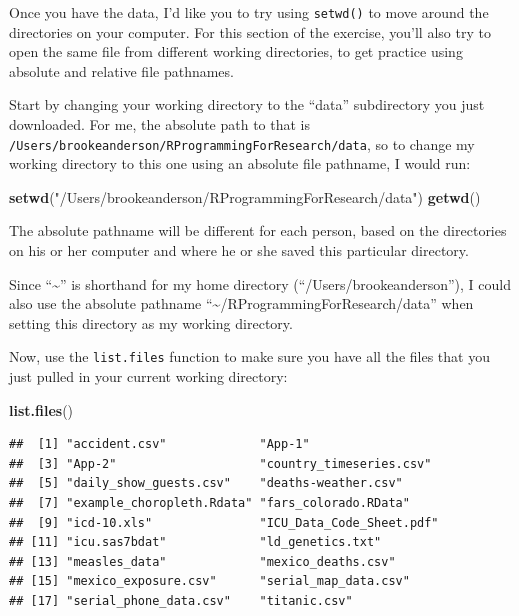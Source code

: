 \documentclass[]{book}
\makeatletter
\newenvironment{Shaded}{\begin{snugshade}}{\end{snugshade}}
\newcommand{\KeywordTok}[1]{\textcolor[rgb]{0.13,0.29,0.53}{\textbf{#1}}}
\newcommand{\StringTok}[1]{\textcolor[rgb]{0.31,0.60,0.02}{#1}}
\newcommand{\NormalTok}[1]{#1}
\newenvironment{kframe}{%
\medskip{}
\setlength{\fboxsep}{.8em}
 \def\at@end@of@kframe{}%
 \ifinner\ifhmode%
  \def\at@end@of@kframe{\end{minipage}}%
  \begin{minipage}{\columnwidth}%
 \fi\fi%
 \def\FrameCommand##1{\hskip\@totalleftmargin \hskip-\fboxsep
 \colorbox{shadecolor}{##1}\hskip-\fboxsep
     \hskip-\linewidth \hskip-\@totalleftmargin \hskip\columnwidth}%
 \MakeFramed {\advance\hsize-\width
   \@totalleftmargin\z@ \linewidth\hsize
   \@setminipage}}%
 {\par\unskip\endMakeFramed%
 \at@end@of@kframe}
\renewenvironment{Shaded}{\begin{kframe}}{\end{kframe}}
\newenvironment{rmdblock}[1]
  {
  \begin{itemize}
  \renewcommand{\labelitemi}{
    \raisebox{-.7\height}[0pt][0pt]{
      {\setkeys{Gin}{width=3em,keepaspectratio}\texttt{[image: images/\#1]}}
    }
  }
  \setlength{\fboxsep}{1em}
  \begin{kframe}
  \item
  }
  {
  \end{kframe}
  \end{itemize}
  }
\newenvironment{rmdnote}
  {\begin{rmdblock}{note}}
  {\end{rmdblock}}
\theoremstyle{definition}
\theoremstyle{definition}
\theoremstyle{definition}
\theoremstyle{remark}
\makeatother
\begin{document}
Once you have the data, I'd like you to try using \texttt{setwd()} to
move around the directories on your computer. For this section of the
exercise, you'll also try to open the same file from different working
directories, to get practice using absolute and relative file pathnames.

Start by changing your working directory to the ``data'' subdirectory
you just downloaded. For me, the absolute path to that is
\texttt{/Users/brookeanderson/RProgrammingForResearch/data}, so to
change my working directory to this one using an absolute file pathname,
I would run:

\begin{Shaded}
\begin{Highlighting}[]
\KeywordTok{setwd}\NormalTok{(}\StringTok{"/Users/brookeanderson/RProgrammingForResearch/data"}\NormalTok{)}
\KeywordTok{getwd}\NormalTok{()}
\end{Highlighting}
\end{Shaded}

The absolute pathname will be different for each person, based on the
directories on his or her computer and where he or she saved this
particular directory.

\begin{rmdnote}
Since ``\textasciitilde{}'' is shorthand for my home directory
(``/Users/brookeanderson''), I could also use the absolute pathname
``\textasciitilde{}/RProgrammingForResearch/data'' when setting this
directory as my working directory.
\end{rmdnote}

Now, use the \texttt{list.files} function to make sure you have all the
files that you just pulled in your current working directory:

\begin{Shaded}
\begin{Highlighting}[]
\KeywordTok{list.files}\NormalTok{()}
\end{Highlighting}
\end{Shaded}

\begin{verbatim}
##  [1] "accident.csv"             "App-1"                   
##  [3] "App-2"                    "country_timeseries.csv"  
##  [5] "daily_show_guests.csv"    "deaths-weather.csv"      
##  [7] "example_choropleth.Rdata" "fars_colorado.RData"     
##  [9] "icd-10.xls"               "ICU_Data_Code_Sheet.pdf" 
## [11] "icu.sas7bdat"             "ld_genetics.txt"         
## [13] "measles_data"             "mexico_deaths.csv"       
## [15] "mexico_exposure.csv"      "serial_map_data.csv"     
## [17] "serial_phone_data.csv"    "titanic.csv"
\end{verbatim}
\end{document}
